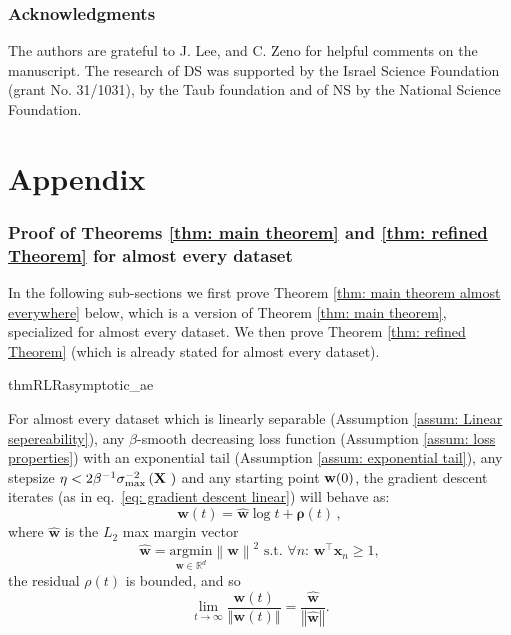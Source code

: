 \documentclass[twoside,11pt,english]{article}
\begin{document}
\section*{Acknowledgments}

The authors are grateful to J. Lee, and C. Zeno for
helpful comments on the manuscript. The research of DS was supported
by the Israel Science Foundation (grant No. 31/1031), by the Taub foundation and of NS by the National Science Foundation.

%
%


\appendix

\part*{\newpage{}Appendix}

\section{Proof of Theorems \ref{thm: main theorem} and \ref{thm: refined Theorem} for almost every dataset\label{sec:proof}}




In the following sub-sections we first prove Theorem \ref{thm: main theorem almost everywhere} below, which is a version of Theorem \ref{thm: main theorem}, specialized for almost every dataset. We then prove Theorem \ref{thm: refined Theorem} (which is already stated for almost every dataset).

\begin{restatable}{thmR}{LRasymptotic_ae}

\label{thm: main theorem almost everywhere} For almost every dataset which is linearly separable (Assumption
\ref{assum: Linear sepereability}), any $\beta$-smooth decreasing
loss function (Assumption \ref{assum: loss properties}) with an exponential
tail (Assumption \ref{assum: exponential tail}), any stepsize $\eta<2\beta^{-1}\sigma_{\max}^{-2}\left(\text{\ensuremath{\mathbf{X}} }\right)$
and any starting point $\mathbf{w}(0)$, the gradient descent iterates (as in eq.~\ref{eq: gradient descent linear}) will behave as: 
\begin{equation}
\mathbf{w}\left(t\right)=\hat{\mathbf{w}}\log t+\boldsymbol{\rho}\left(t\right)\,,
\end{equation}
where $\hat{\mathbf{w}}$ is the $L_{2}$ max margin vector 
\[
\hat{\mathbf{w}}=\underset{\mathbf{\mathbf{w}}\in\mathbb{R}^{d}}{\mathrm{argmin}}\left\lVert \mathbf{w}\right\rVert ^{2}\,\,\mathrm{s.t.}\,\,\forall n:\,\mathbf{w}^{\top}\mathbf{x}_{n}\geq1,
\]
the residual $\rho(t)$ is bounded, and so 
\[
\lim_{t\rightarrow\infty}\frac{\mathbf{w}\left(t\right)}{\left\Vert \mathbf{w}\left(t\right)\right\Vert }=\frac{\hat{\mathbf{w}}}{\left\Vert \hat{\mathbf{w}}\right\Vert }.
\]
\end{restatable}
\end{document}
